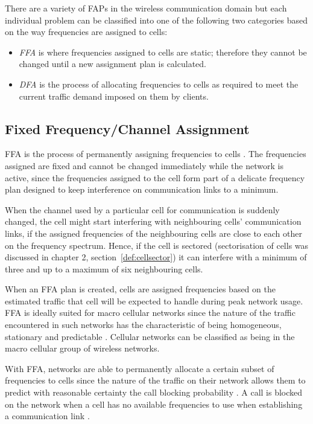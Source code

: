 There are a variety of \gls{FAP}s in the wireless communication domain but each individual problem can be classified into one of the following two categories based on the way frequencies are assigned to cells:
\begin{itemize}
  \item \emph{\gls{FFA}} is where frequencies assigned to cells are static; therefore they cannot be changed until a new assignment plan is calculated\cite{PrinciplesMobileCommunication}.
\item \emph{\gls{DFA}} is the process of allocating frequencies to cells as required to meet the current traffic demand imposed on them by clients\cite{PrinciplesMobileCommunication}. 
\end{itemize}

\subsection{Fixed Frequency/Channel Assignment}
\gls{FFA} is the process of permanently assigning frequencies to cells \cite{PrinciplesMobileCommunication}. The frequencies assigned are fixed and cannot be changed immediately while the network is active, since the frequencies assigned to the cell form part of a delicate frequency plan designed to keep interference on communication links to a minimum\cite{PrinciplesMobileCommunication}. 

When the channel used by a particular cell for communication is suddenly changed, the cell might start interfering with neighbouring cells' communication links, if the assigned frequencies of the neighbouring cells are close to each other on the frequency spectrum. Hence, if the cell is sectored (sectorisation of cells was discussed in chapter 2, section~\ref{def:cellsector}) it can interfere with a minimum of three and up to a maximum of six neighbouring cells\cite{PrinciplesMobileCommunication}.

When an \gls{FFA} plan is created, cells are assigned frequencies based on the estimated traffic that cell will be expected to handle during peak network usage. \gls{FFA} is ideally suited for macro cellular networks since the nature of the traffic encountered in such networks has the characteristic of being homogeneous, stationary and predictable \cite{PrinciplesMobileCommunication}. Cellular networks can be classified as being in the macro cellular group of wireless networks.

With \gls{FFA}, networks are able to permanently allocate a certain subset of frequencies to cells since the nature of the traffic on their network allows them to predict with reasonable certainty the call blocking probability \cite{PrinciplesMobileCommunication}. A call is blocked on the network when a cell has no available frequencies to use when establishing a communication link \cite{PrinciplesMobileCommunication}.


